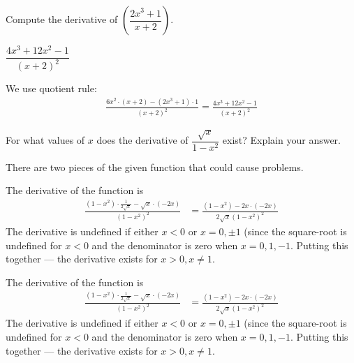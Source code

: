\begin{question}[2015Q]
 Compute the derivative of $\left(\dfrac{2x^3+1}{x+2}\right)$.
\end{question}
\begin{answer}
$\dfrac{4x^3+12x^2-1}{(x+2)^2}$
\end{answer}
\begin{solution}
We use quotient rule:
\begin{align*}
\frac{6x^2\cdot (x+2)-(2x^3+1)\cdot 1}{(x+2)^2}=\frac{4x^3+12x^2-1}{(x+2)^2}
\end{align*}
\end{solution}




\begin{Mquestion}[2015Q]
For what values of $x$ does the derivative of
$\dfrac{\sqrt{x}}{1-x^2}$ exist? Explain your answer.
\end{Mquestion}
\begin{hint} There are two pieces of the given function that could cause problems.
\end{hint}
\begin{answer}
The derivative of the function is
\begin{align*}
 \frac{(1-x^2)\cdot\frac{1}{2\sqrt{x}} - \sqrt{x} \cdot (-2x)}{(1-x^2)^2}
  &= \frac{(1-x^2) - 2x \cdot (-2x)}{2\sqrt{x}(1-x^2)^2}
\end{align*}
The derivative is undefined if either $x<0$ or $x = 0,\pm 1$ (since the square-root is
undefined for $x<0$ and the denominator is zero when $x=0,1,-1$. Putting this together
--- the derivative exists for $x>0, x\neq 1$.
\end{answer}
\begin{solution}
The derivative of the function is
\begin{align*}
 \frac{(1-x^2)\cdot\frac{1}{2\sqrt{x}} - \sqrt{x} \cdot (-2x)}{(1-x^2)^2}
  &= \frac{(1-x^2) - 2x \cdot (-2x)}{2\sqrt{x}(1-x^2)^2}
\end{align*}
The derivative is undefined if either $x<0$ or $x = 0,\pm 1$ (since the square-root is
undefined for $x<0$ and the denominator is zero when $x=0,1,-1$. Putting this together
--- the derivative exists for $x>0, x\neq 1$.
\end{solution}


